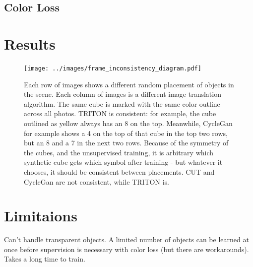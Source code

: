\documentclass{article}
\begin{document}
\subsection{Color Loss}




\section{Results}
\label{sec:results}

\begin{figure}[H]
	\begin{center}
		\texttt{[image: ../images/frame\_inconsistency\_diagram.pdf]}
	\end{center}

	
	\caption{
		Each row of images shows a different random placement of objects in the scene.
		Each column of images is a different image translation algorithm.
		The same cube is marked with the same color outline across all photos.
		TRITON is consistent: for example, the cube outlined as yellow always has an 8 on the top.
		Meanwhile, CycleGan for example shows a 4 on the top of that cube in the top two rows, but an 8 and a 7 in the next two rows.
		Because of the symmetry of the cubes, and the unsupervised training, it is arbitrary which synthetic cube gets which symbol after training - but whatever it chooses, it should be consistent between placements.
		CUT and CycleGan are not consistent, while TRITON is.
		}
	\label{fig:frame_inconsistency_diagram}
\end{figure}


\section{Limitaions}
\label{sec:Limitations} 

Can't handle transparent objects. 
A limited number of objects can be learned at once before supervision is necessary with color loss (but there are workarounds).
Takes a long time to train.
\end{document}
